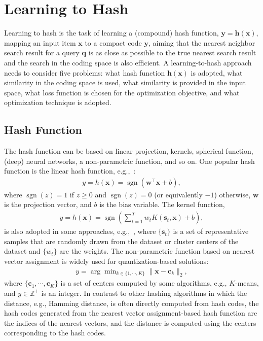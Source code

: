 \documentclass[10pt,journal,compsoc]{IEEEtran}
\begin{document}
\section{Learning to Hash}
\label{sec:conceptOfLTH}
Learning to hash
is the task of
learning a (compound) hash function,
$\mathbf{y} = \mathbf{h}(\mathbf{x})$,
mapping an input item $\mathbf{x}$
to a compact code $\mathbf{y}$,
aiming that
the nearest neighbor search result for a query $\mathbf{q}$
is as close as possible to the true nearest search result
and the search in the coding space is also efficient.
A learning-to-hash approach
needs to consider five problems:
what hash function $\mathbf{h}(\mathbf{x})$ is adopted,
what similarity in the coding space is used,
what similarity is provided in the input space,
what loss function is chosen for the optimization objective,
and what optimization technique is adopted.

\subsection{Hash Function}
The hash function can be based on linear projection,
kernels,
spherical function,
(deep) neural networks,
a non-parametric function,
and so on.
One popular hash function is the linear hash function,
e.g.,~\cite{WangKC10a, StrechaBBF12}:
\begin{align}
y = h(\mathbf{x}) = \operatorname{sgn}(\mathbf{w}^\top\mathbf{x} + b),
\end{align}
where $\operatorname{sgn}(z) = 1$
if $z \geqslant 0$
and $\operatorname{sgn}(z) = 0$
(or equivalently $-1$)
otherwise,
$\mathbf{w}$ is the projection vector,
and $b$ is the bias variable.
The kernel function,
\begin{align}
y = h(\mathbf{x}) = \operatorname{sgn}\left(\sum\nolimits_{t=1}^Tw_t K(\mathbf{s}_t,\mathbf{x}) + b\right),
\end{align}
is also adopted in some approaches,
e.g.,~\cite{KulisD09,HeLC10},
where $\{\mathbf{s}_t\}$ is a set of representative samples
that are randomly drawn from the dataset
or cluster centers of the dataset
and $\{w_t\}$ are the weights.
The non-parametric function based on nearest vector assignment is widely
used for quantization-based solutions:
\begin{align}
y = \arg\min\nolimits_{k \in \{1, \cdots, K\}} \|\mathbf{x} - \mathbf{c}_k\|_2,
\end{align}
where $\{\mathbf{c}_1, \cdots, \mathbf{c}_K\}$ is a set of centers
computed by some algorithms, e.g., $K$-means,
and $y \in \mathbb{Z}^{+}$ is an integer.
In contrast to other hashing algorithms
in which the distance, e.g., Hamming distance,
is often directly computed from hash codes,
the hash codes generated
from the nearest vector assignment-based hash function
are the indices of the nearest vectors,
and the distance is computed using the centers
corresponding to the hash codes.
\end{document}
